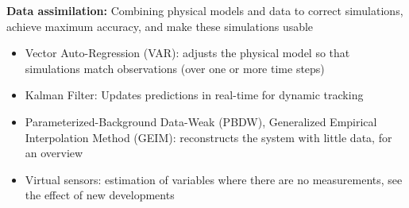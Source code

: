 \documentclass{beamer}
\begin{document}
\begin{frame}
    \small
    \textbf{Data assimilation:} Combining physical models and data to correct simulations, achieve maximum accuracy, and make these simulations usable %
    \vspace{0.2cm}
    \begin{itemize}
        \item Vector Auto-Regression (VAR): adjusts the physical model so that simulations match observations (over one or more time steps)
        \item Kalman Filter: Updates predictions in real-time for dynamic tracking
        \item Parameterized-Background Data-Weak (PBDW), Generalized Empirical Interpolation Method (GEIM): reconstructs the system with little data, for an overview
        \item Virtual sensors: estimation of variables where there are no measurements, see the effect of new developments
    \end{itemize}
\end{frame}
\end{document}
